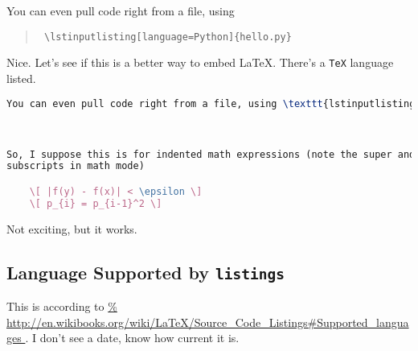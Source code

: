 You can even pull code right from a file, using

\begin{quote}
	\texttt{ \textbackslash{}lstinputlisting[language=Python]\{hello.py\} }
\end{quote}

%


Nice.  Let's see if this is a better way to embed LaTeX.  There's a
\texttt{TeX} language listed.

\begin{lstlisting}[language=TeX]
You can even pull code right from a file, using \texttt{lstinputlisting}

	

So, I suppose this is for indented math expressions (note the super and
subscripts in math mode)

	\[ |f(y) - f(x)| < \epsilon \]
	\[ p_{i} = p_{i-1}^2 \]

\end{lstlisting}

Not exciting, but it works.


\subsection{Language Supported by \texttt{listings}}

This is according to \url{%
http://en.wikibooks.org/wiki/LaTeX/Source_Code_Listings#Supported_languages
} .  I don't see a date, know how current it is.

